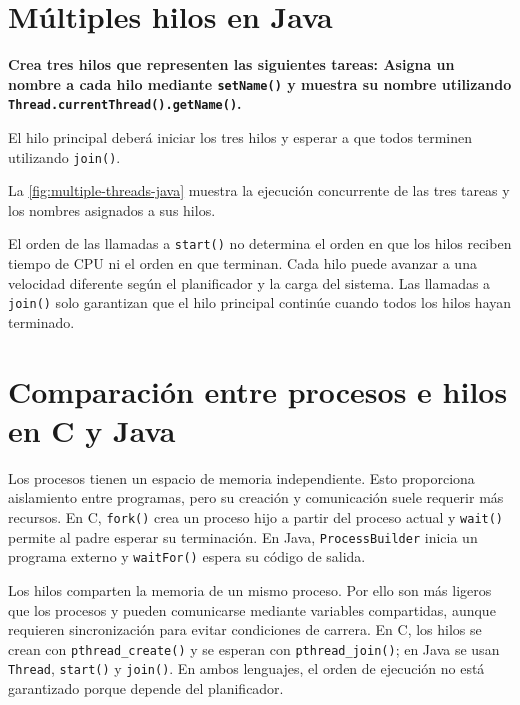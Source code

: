 \documentclass[12pt,oneside]{template/liverpoolthesis}
\begin{document}


\chapter{Múltiples hilos en Java}

\textbf{Crea tres hilos que representen las siguientes tareas:
Asigna un nombre a cada hilo mediante \texttt{setName()} y muestra su nombre
utilizando \texttt{Thread.currentThread().getName()}.}

El hilo principal deberá iniciar los tres hilos y esperar a que todos terminen
utilizando \texttt{join()}.


La \autoref{fig:multiple-threads-java} muestra la ejecución concurrente de las
tres tareas y los nombres asignados a sus hilos.

El orden de las llamadas a \texttt{start()} no determina el orden en que
los hilos reciben tiempo de CPU ni el orden en que terminan. Cada hilo puede
avanzar a una velocidad diferente según el planificador y la carga del sistema.
Las llamadas a \texttt{join()} solo garantizan que el hilo principal continúe
cuando todos los hilos hayan terminado.

\chapter{Comparación entre procesos e hilos en C y Java}

Los procesos tienen un espacio de memoria independiente. Esto proporciona
aislamiento entre programas, pero su creación y comunicación suele requerir
más recursos. En C, \texttt{fork()} crea un proceso hijo a partir del proceso
actual y \texttt{wait()} permite al padre esperar su terminación. En Java,
\texttt{ProcessBuilder} inicia un programa externo y \texttt{waitFor()} espera
su código de salida.

Los hilos comparten la memoria de un mismo proceso. Por ello son más ligeros
que los procesos y pueden comunicarse mediante variables compartidas, aunque
requieren sincronización para evitar condiciones de carrera. En C, los hilos se
crean con \texttt{pthread\_create()} y se esperan con
\texttt{pthread\_join()}; en Java se usan \texttt{Thread}, \texttt{start()} y
\texttt{join()}. En ambos lenguajes, el orden de ejecución no está garantizado
porque depende del planificador.

\cleardoublepage
{}
{}
\nocite{*}

\end{document}
